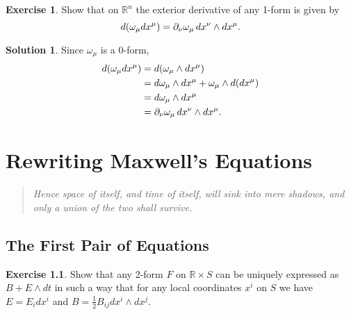 \documentclass[11pt, a4paper]{report}
\theoremstyle{definition}
\newtheorem{exercise}{Exercise}[part]
\newtheorem{solution}{Solution}[part]
\newenvironment{ex}{\begin{exercise}}{\end{exercise}\pagebreak[1]}
\newenvironment{sol}{\begin{solution}}{\end{solution}\pagebreak[3]}
\newenvironment{epigraph}
    {\begin{quote}\small\itshape} %
    {\end{quote}\ignorespacesafterend\vspace{\parskip}}
\renewcommand*{\d}{\ensuremath\mathop{}\mathopen{}d}
\begin{document}
\begin{ex}

Show that on $\mathbb{R}^n$ the exterior derivative of any 1-form is given by
\[
    d(\omega_\mu dx^\mu) = \partial_\nu \omega_\mu \d x^\nu \wedge dx^\mu.
\]

\end{ex}

\begin{sol}

Since $\omega_\mu$ is a 0-form,
\begin{align*}
    d(\omega_\mu dx^\mu) &= d(\omega_\mu \wedge dx^\mu) \\
        &= d\omega_\mu \wedge dx^\mu + \omega_\mu \wedge d(dx^\mu) \\
        &= d\omega_\mu \wedge dx^\mu \\
        &= \partial_\nu \omega_\mu \d x^\nu \wedge dx^\mu.
\end{align*}

\end{sol}

\chapter{Rewriting Maxwell's Equations}

\begin{epigraph}
    Hence space of itself, and time of itself, will sink into mere shadows, and only a union of the two shall survive.
\end{epigraph}

\section{The First Pair of Equations}

\begin{ex}

Show that any 2-form $F$ on $\mathbb{R} \times S$ can be uniquely expressed as $B + E \wedge dt$ in such a way that for any local coordinates $x^i$ on $S$ we have $E = E_i dx^i$ and $B = \frac{1}{2}B_{ij}dx^i \wedge dx^j$.

\end{ex}
\end{document}
